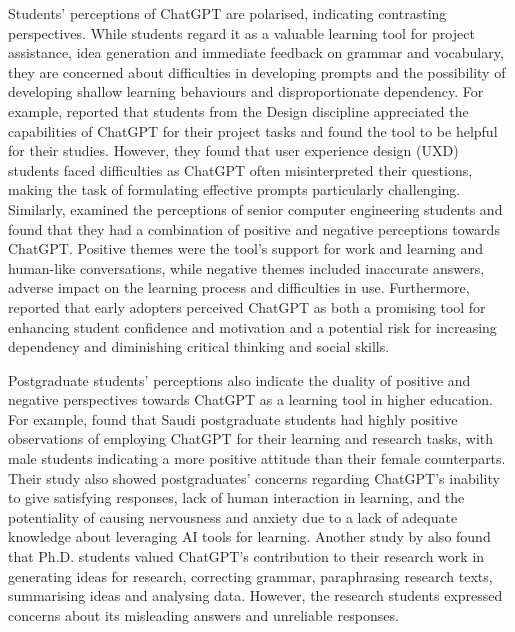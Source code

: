 \documentclass[english]{textolivre}
\begin{document}
Students’ perceptions of ChatGPT are polarised, indicating contrasting perspectives. While students regard it as a valuable learning tool for project assistance, idea generation and immediate feedback on grammar and vocabulary, they are concerned about difficulties in developing prompts and the possibility of developing shallow learning behaviours and disproportionate dependency. For example, \textcite{chellappa2024} reported that students from the Design discipline appreciated the capabilities of ChatGPT for their project tasks and found the tool to be helpful for their studies. However, they found that user experience design (UXD) students faced difficulties as ChatGPT often misinterpreted their questions, making the task of formulating effective prompts particularly challenging. Similarly, \textcite{shoufan2023} examined the perceptions of senior computer engineering students and found that they had a combination of positive and negative perceptions towards ChatGPT. Positive themes were the tool’s support for work and learning and human-like conversations, while negative themes included inaccurate answers, adverse impact on the learning process and difficulties in use. Furthermore, \textcite{mogavi2024} reported that early adopters perceived ChatGPT as both a promising tool for enhancing student confidence and motivation and a potential risk for increasing dependency and diminishing critical thinking and social skills.

Postgraduate students’ perceptions also indicate the duality of positive and negative perspectives towards ChatGPT as a learning tool in higher education. For example, \textcite{abusaaleek2024} found that Saudi postgraduate students had highly positive observations of employing ChatGPT for their learning and research tasks, with male students indicating a more positive attitude than their female counterparts. Their study also showed postgraduates’ concerns regarding ChatGPT’s inability to give satisfying responses, lack of human interaction in learning, and the potentiality of causing nervousness and anxiety due to a lack of adequate knowledge about leveraging AI tools for learning. Another study by \textcite{chia2024} also found that Ph.D. students valued ChatGPT’s contribution to their research work in generating ideas for research, correcting grammar, paraphrasing research texts, summarising ideas and analysing data. However, the research students expressed concerns about its misleading answers and unreliable responses.
\end{document}
